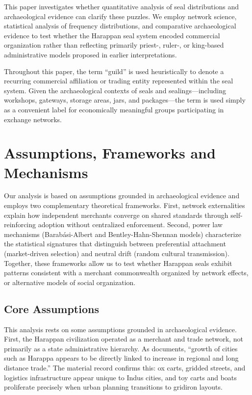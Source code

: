 \documentclass[12pt]{article}
\begin{document}
This paper investigates whether quantitative analysis of seal distributions and
archaeological evidence can clarify these puzzles. We employ network science,
statistical analysis of frequency distributions, and comparative archaeological
evidence to test whether the Harappan seal system encoded commercial organization
rather than reflecting primarily priest-, ruler-, or king-based administrative
models proposed in earlier interpretations.

Throughout this paper, the term ``guild'' is used heuristically to denote a
recurring commercial affiliation or trading entity represented within the
seal system. Given the archaeological contexts of seals and sealings—including
workshops, gateways, storage areas, jars, and packages—the term is used simply
as a convenient label for economically meaningful groups participating in exchange
networks.

\section{Assumptions, Frameworks and Mechanisms}

Our analysis is based on assumptions grounded in archaeological evidence
and employs two complementary theoretical frameworks. First, network externalities
explain how independent merchants converge on shared standards 
through self-reinforcing adoption without centralized enforcement. Second, power law 
mechanisms (Barab{\'a}si-Albert and Bentley-Hahn-Shennan models) characterize the 
statistical signatures that distinguish between preferential attachment (market-driven 
selection) and neutral drift (random cultural transmission). Together, these frameworks 
allow us to test whether Harappan seals exhibit patterns consistent with a merchant 
commonwealth organized by network effects, or alternative models of social organization.

\subsection{Core Assumptions}

This analysis rests on some assumptions grounded in archaeological 
evidence. First, the Harappan civilization operated as a merchant and trade network, 
not primarily as a state administrative hierarchy. As \citet{kenoyer2005indus} documents, 
``growth of cities such as Harappa appears to be directly linked to increase in 
regional and long distance trade.'' The material record confirms this: ox carts, 
gridded streets, and logistics infrastructure appear unique to Indus cities, and 
toy carts and boats proliferate precisely when urban planning transitions to gridiron 
layouts.
\end{document}
